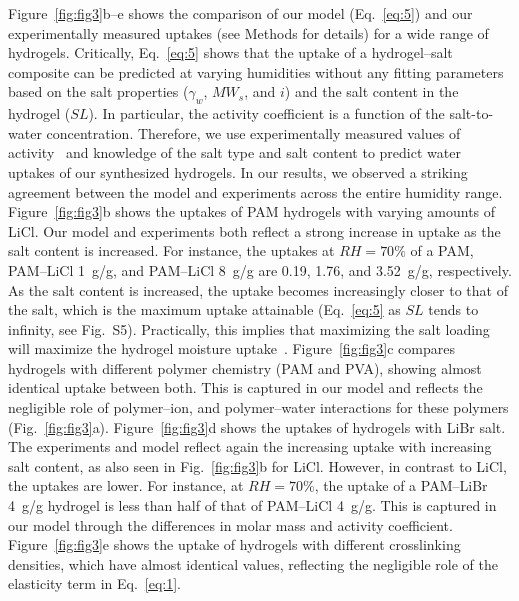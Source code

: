 \documentclass[11pt]{article}
\begin{document}
Figure~\ref{fig:fig3}b--e shows the comparison of our model (Eq.~\ref{eq:5}) and our experimentally measured uptakes (see Methods for details) for a wide range of hydrogels. Critically, Eq.~\ref{eq:5} shows that the uptake of a hydrogel--salt composite can be predicted at varying humidities without any fitting parameters based on the salt properties ($\gamma_w$, $MW_s$, and $i$) and the salt content in the hydrogel ($SL$). In particular, the activity coefficient is a function of the salt-to-water concentration. Therefore, we use experimentally measured values of activity~\cite{palacios2012,conde2004} and knowledge of the salt type and salt content to predict water uptakes of our synthesized hydrogels. In our results, we observed a striking agreement between the model and experiments across the entire humidity range. Figure~\ref{fig:fig3}b shows the uptakes of PAM hydrogels with varying amounts of LiCl. Our model and experiments both reflect a strong increase in uptake as the salt content is increased. For instance, the uptakes at $RH = 70\%$ of a PAM, PAM--LiCl 1~g/g, and PAM--LiCl 8~g/g are 0.19, 1.76, and 3.52~g/g, respectively. As the salt content is increased, the uptake becomes increasingly closer to that of the salt, which is the maximum uptake attainable (Eq.~\ref{eq:5} as $SL$ tends to infinity, see Fig.~S5). Practically, this implies that maximizing the salt loading will maximize the hydrogel moisture uptake~\cite{graeber2023}. Figure~\ref{fig:fig3}c compares hydrogels with different polymer chemistry (PAM and PVA), showing almost identical uptake between both. This is captured in our model and reflects the negligible role of polymer--ion, and polymer--water interactions for these polymers (Fig.~\ref{fig:fig3}a). Figure~\ref{fig:fig3}d shows the uptakes of hydrogels with LiBr salt. The experiments and model reflect again the increasing uptake with increasing salt content, as also seen in Fig.~\ref{fig:fig3}b for LiCl. However, in contrast to LiCl, the uptakes are lower. For instance, at $RH = 70\%$, the uptake of a PAM--LiBr 4~g/g hydrogel is less than half of that of PAM--LiCl 4~g/g. This is captured in our model through the differences in molar mass and activity coefficient. Figure~\ref{fig:fig3}e shows the uptake of hydrogels with different crosslinking densities, which have almost identical values, reflecting the negligible role of the elasticity term in Eq.~\ref{eq:1}.
\end{document}
